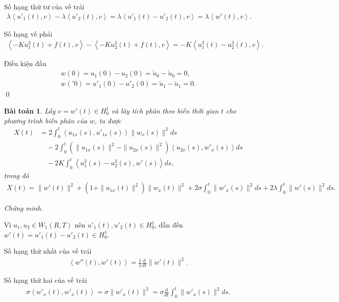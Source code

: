 \documentclass[12pt,a4paper]{article}
\newtheorem{theorem}{Bài toán}[section]
\theoremstyle{definition}
\begin{document}
Số hạng thứ tư của vế trái
\begin{align*}
    \lambda \left<u'_1(t),v\right> - \lambda \left<u'_2(t),v\right>
    = \lambda \left<u'_1(t) - u'_2(t),v\right>
    = \lambda \left<w'(t),v\right>.
\end{align*}

Số hạng vế phải
\begin{align*}
     \left<-Ku^3_1(t) + f(t),v\right> - \left<-Ku^3_2(t) + f(t),v\right> = -K \left<u^3_1(t) - u^3_2(t),v\right>.
\end{align*}

Điều kiện đầu
\begin{align*}
    w(0) = u_1(0) - u_2(0) = \tilde{u}_0 - \tilde{u}_0 = 0, \\
    w('0) = u'_1(0) - u'_2(0) = \tilde{u}_1 - \tilde{u}_1 = 0.
\end{align*} \qed

\begin{theorem}
    Lấy $v = w'(t) \in H^1_0$ và lây tích phân theo biến thời gian $t$ cho phương trình biến phân của $w$, ta được
    \begin{align*}
        X(t) &= 2 \int_0^t \left<u_{1x}(s), u'_{1x}(s)\right> \|w_x(s)\|^2 ds \\
        &\quad - 2 \int_0^t \left(\|u_{1x}(s)\|^2 - \|u_{2x}(s)\|^2\right) \left<u_{2x}(s),w'_x(s)\right> ds \\
        &\quad - 2K \int_0^t \left<u^3_1(s) - u^3_2(s), w'(s)\right>ds,
    \end{align*}
    trong đó
    \begin{align*}
        X(t) = \|w'(t)\|^2 + \left(1 + \|u_{1x}(t)\|^2\right) \|w_x(t)\|^2
        + 2\sigma \int_0^t \|w'_x(s)\|^2 ds + 2\lambda \int_0^t \|w'(s)\|^2 ds.
    \end{align*}
\end{theorem}

\textit{Chứng minh.}

Vì $u_1, u_2 \in W_1(R,T)$ nên $u'_1(t), u'_2(t) \in H^1_0$, dẫn đến $w'(t) = u'_1(t) - u'_2(t) \in H^1_0$.

Số hạng thứ nhất của vế trái
\begin{align*}
    \left<w''(t),w'(t)\right> = \frac{1}{2} \frac{d}{dt} \|w'(t)\|^2.
\end{align*}

Số hạng thứ hai của vế trái
\begin{align*}
    \sigma \left<w'_x(t),w'_x(t)\right> = \sigma \|w'_x(t)\|^2 = \sigma \frac{d}{dt} \int_0^t \|w'_x(s)\|^2 ds.
\end{align*}
\end{document}
